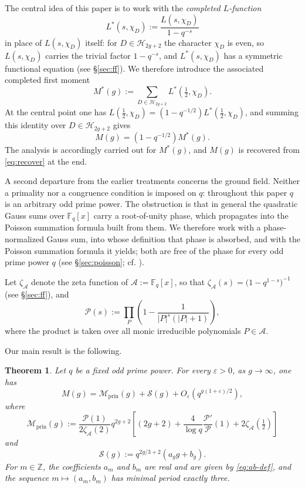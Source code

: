 \documentclass[a4paper,reqno]{amsart}
\numberwithin{equation}{section}
\newtheorem{theorem}{Theorem}[section]
\theoremstyle{remark}
\theoremstyle{definition}
\newcommand{\A}{\mathcal{A}}
\newcommand{\zA}{\zeta_{\A}}
\begin{document}
The central idea of this paper is to work with the \emph{completed
$L$-function}
$$
L^*(s,\chi_D):=\frac{L(s,\chi_D)}{1-q^{-s}}
$$
in place of $L(s,\chi_D)$ itself: for $D\in\mathcal H_{2g+2}$ the character
$\chi_D$ is even, so $L(s,\chi_D)$ carries the trivial factor $1-q^{-s}$,
and $L^*(s,\chi_D)$ has a symmetric functional equation (see \S\ref{sec:ff}). 
We therefore introduce the associated completed first
moment
\begin{equation}\label{eq:completed_moment_intro}
M^*(g)
:=
\sum_{D\in\mathcal H_{2g+2}}
L^*\!\left(\tfrac12,\chi_D\right).
\end{equation}
At the central point one has
$L\!\left(\tfrac12,\chi_D\right)=(1-q^{-1/2})L^*\!\left(\tfrac12,\chi_D\right)$,
and summing this identity over $D\in\mathcal H_{2g+2}$ gives
\begin{equation}\label{eq:recover}
M(g)
=
(1-q^{-1/2})M^*(g).
\end{equation}
The analysis is accordingly carried out for $M^*(g)$, and $M(g)$ is
recovered from \eqref{eq:recover} at the end.

A second departure from the earlier treatments concerns the ground field.
Neither a primality nor a congruence condition is imposed on $q$: throughout
this paper $q$ is an arbitrary odd prime power. The obstruction is that in
general the quadratic Gauss sums over $\mathbb F_q[x]$ carry a root-of-unity
phase, which propagates into the Poisson summation formula built from them.
We therefore work with a phase-normalized Gauss sum, into whose definition
that phase is absorbed, and with the Poisson summation formula it yields;
both are free of the phase for every odd prime power $q$
(see \S\ref{sec:poisson}; cf. \cite[Section~9]{Fl17-1}).

Let $\zA$ denote the zeta function of $\A:=\mathbb F_q[x]$, so that
$\zA(s)=\bigl(1-q^{1-s}\bigr)^{-1}$ (see \S\ref{sec:ff}), and
$$
\mathscr P(s)
:=
\prod_P
\left(
1-\frac{1}{|P|^s(|P|+1)}
\right),
$$
where the product is taken over all monic irreducible polynomials $P\in\A$.

Our main result is the following.


\begin{theorem}\label{thm:main}
Let $q$ be a fixed odd prime power. For every $\varepsilon>0$, as
$g\to\infty$, one has
\begin{equation}\label{eq:main}
M(g)
=
\mathcal M_{\mathrm{prin}}(g)
+
\mathcal S(g)
+
O_\varepsilon\!\left(q^{g(1+\varepsilon)/2}\right),
\end{equation}
where
\begin{equation}\label{eq:Mprin-intro}
\mathcal M_{\mathrm{prin}}(g)
:=
\frac{\mathscr P(1)}{2\zA(2)}
q^{2g+2}
\left[
(2g+2)
+
\frac{4}{\log q}
\frac{\mathscr P'}{\mathscr P}(1)
+
2\zA\!\left(\tfrac12\right)
\right]
\end{equation}
and
\begin{equation}\label{eq:S-intro}
\mathcal S(g)
:=
q^{2g/3+2}
\left(
a_gg+b_g
\right).
\end{equation}
For $m\in\mathbb Z$, the coefficients $a_m$ and $b_m$ are real and are given
by \eqref{eq:ab-def}, and the sequence
$m\mapsto(a_m,b_m)$ has minimal period exactly three.
\end{theorem}
\end{document}
